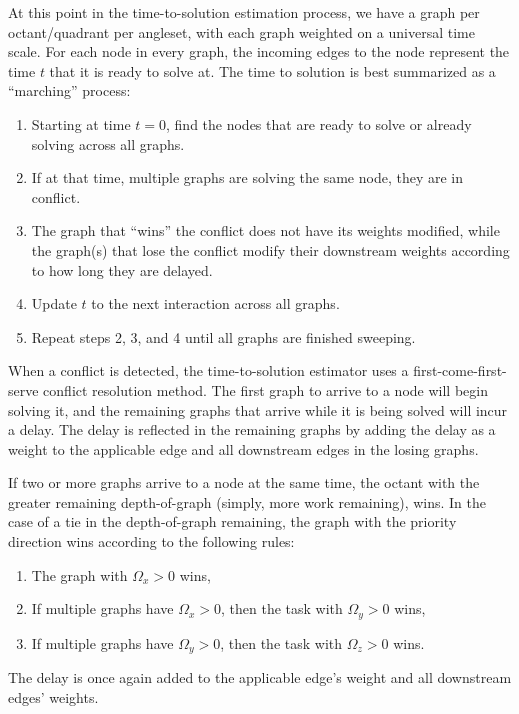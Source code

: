 At this point in the time-to-solution estimation process, we have a graph per octant/quadrant per angleset, with each graph weighted on a universal time scale.
For each node in every graph, the incoming edges to the node represent the time $t$ that it is ready to solve at.
The time to solution is best summarized as a ``marching'' process:
\begin{enumerate}
  \item Starting at time $t=0$, find the nodes that are ready to solve or already solving across all graphs.
  \item If at that time, multiple graphs are solving the same node, they are in conflict.
  \item The graph that ``wins'' the conflict does not have its weights modified, while the graph(s) that lose the conflict modify their downstream weights according to how long they are delayed.
  \item Update $t$ to the next interaction across all graphs.
  \item Repeat steps 2, 3, and 4 until all graphs are finished sweeping.
\end{enumerate}

When a conflict is detected, the time-to-solution estimator uses a first-come-first-serve conflict resolution method.
The first graph to arrive to a node will begin solving it, and the remaining graphs that arrive while it is being solved will incur a delay.
The delay is reflected in the remaining graphs by adding the delay as a weight to the applicable edge and all downstream edges in the losing graphs.

If two or more graphs arrive to a node at the same time, the octant with the greater remaining depth-of-graph (simply, more work remaining), wins.
In the case of a tie in the depth-of-graph remaining, the graph with the priority direction wins according to the following rules:
\begin{enumerate}
    \item The graph with $\Omega_x > 0$ wins,
	\item If multiple graphs have $\Omega_x > 0$, then the task with $\Omega_y > 0$ wins,
	\item If multiple graphs have $\Omega_y > 0$, then the task with $\Omega_z > 0$ wins.
\end{enumerate}
The delay is once again added to the applicable edge's weight and all downstream edges' weights.

